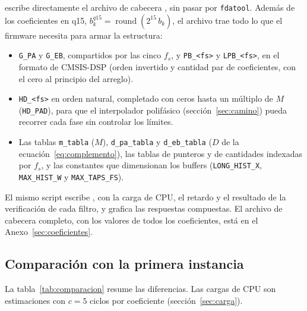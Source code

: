 \documentclass[11pt,a4paper]{article}
\begin{document}
 escribe directamente el archivo de cabecera
, sin pasar por \texttt{fdatool}.
Además de los coeficientes en q15,
$b_k^{q15} = \operatorname{round}\!\left(2^{15}\, b_k\right)$, el archivo
trae todo lo que el firmware necesita para armar la estructura:
\begin{itemize}
  \item \texttt{G\_PA} y \texttt{G\_EB}, compartidos por las cinco $f_s$, y
        \texttt{PB\_<fs>} y \texttt{LPB\_<fs>}, en el formato de CMSIS-DSP
        (orden invertido y cantidad par de coeficientes, con el cero al
        principio del arreglo).
  \item \texttt{HD\_<fs>} en orden natural, completado con ceros hasta un
        múltiplo de $M$ (\texttt{HD\_PAD}), para que el interpolador
        polifásico (sección~\ref{sec:camino}) pueda recorrer cada fase sin
        controlar los límites.
  \item Las tablas \texttt{m\_tabla} ($M$), \texttt{d\_pa\_tabla} y
        \texttt{d\_eb\_tabla} ($D$ de la
        ecuación~\eqref{eq:complemento}), las tablas de punteros y de
        cantidades indexadas por $f_s$, y las constantes que dimensionan los
        buffers (\texttt{LONG\_HIST\_X}, \texttt{MAX\_HIST\_W} y
        \texttt{MAX\_TAPS\_FS}).
\end{itemize}
El mismo script escribe , con la carga de
CPU, el retardo y el resultado de la verificación de cada filtro, y grafica
las respuestas compuestas. El archivo de cabecera completo, con los valores
de todos los coeficientes, está en el Anexo~\ref{sec:coeficientes}.

\subsection{Comparación con la primera instancia}\label{sec:taps}

La tabla~\ref{tab:comparacion} resume las diferencias. Las cargas de CPU son
estimaciones con $c = 5$ ciclos por coeficiente (sección~\ref{sec:carga}).
\end{document}
